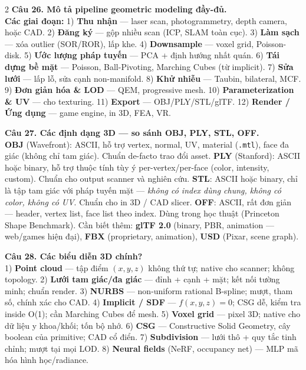 \begin{paracol}{2}
\textbf{Câu 26. Mô tả pipeline geometric modeling đầy-đủ.}\\
\textbf{Các giai đoạn:} 1) \textbf{Thu nhận} — laser scan, photogrammetry, depth camera, hoặc CAD. 2) \textbf{Đăng ký} — gộp nhiều scan (ICP, SLAM toàn cục). 3) \textbf{Làm sạch} — xóa outlier (SOR/ROR), lấp khe. 4) \textbf{Downsample} — voxel grid, Poisson-disk. 5) \textbf{Ước lượng pháp tuyến} — PCA + định hướng nhất quán. 6) \textbf{Tái dựng bề mặt} — Poisson, Ball-Pivoting, Marching Cubes (từ implicit). 7) \textbf{Sửa lưới} — lấp lỗ, sửa cạnh non-manifold. 8) \textbf{Khử nhiễu} — Taubin, bilateral, MCF. 9) \textbf{Đơn giản hóa \& LOD} — QEM, progressive mesh. 10) \textbf{Parameterization \& UV} — cho texturing. 11) \textbf{Export} — OBJ/PLY/STL/glTF. 12) \textbf{Render / Ứng dụng} — game engine, in 3D, FEA, VR.

\textbf{Câu 27. Các định dạng 3D — so sánh OBJ, PLY, STL, OFF.}\\
\textbf{OBJ} (Wavefront): ASCII, hỗ trợ vertex, normal, UV, material (\verb|.mtl|), face đa giác (không chỉ tam giác). Chuẩn de-facto trao đổi asset. \textbf{PLY} (Stanford): ASCII hoặc binary, hỗ trợ thuộc tính tùy ý per-vertex/per-face (color, intensity, custom). Chuẩn cho output scanner và nghiên cứu. \textbf{STL}: ASCII hoặc binary, chỉ là tập tam giác với pháp tuyến mặt — \textit{không có index dùng chung, không có color, không có UV}. Chuẩn cho in 3D / CAD slicer. \textbf{OFF}: ASCII, rất đơn giản — header, vertex list, face list theo index. Dùng trong học thuật (Princeton Shape Benchmark). Cần biết thêm: \textbf{glTF 2.0} (binary, PBR, animation — web/games hiện đại), \textbf{FBX} (proprietary, animation), \textbf{USD} (Pixar, scene graph).

\textbf{Câu 28. Các biểu diễn 3D chính?}\\
1) \textbf{Point cloud} — tập điểm $(x,y,z)$ không thứ tự; native cho scanner; không topology. 2) \textbf{Lưới tam giác/đa giác} — đỉnh + cạnh + mặt; kết nối tường minh; chuẩn render. 3) \textbf{NURBS} — non-uniform rational B-spline; mượt, tham số, chính xác cho CAD. 4) \textbf{Implicit / SDF} — $f(x,y,z)=0$; CSG dễ, kiểm tra inside O(1); cần Marching Cubes để mesh. 5) \textbf{Voxel grid} — pixel 3D; native cho dữ liệu y khoa/khối; tốn bộ nhớ. 6) \textbf{CSG} — Constructive Solid Geometry, cây boolean của primitive; CAD cổ điển. 7) \textbf{Subdivision} — lưới thô + quy tắc tinh chỉnh; mượt tại mọi LOD. 8) \textbf{Neural fields} (NeRF, occupancy net) — MLP mã hóa hình học/radiance.


\end{paracol}
